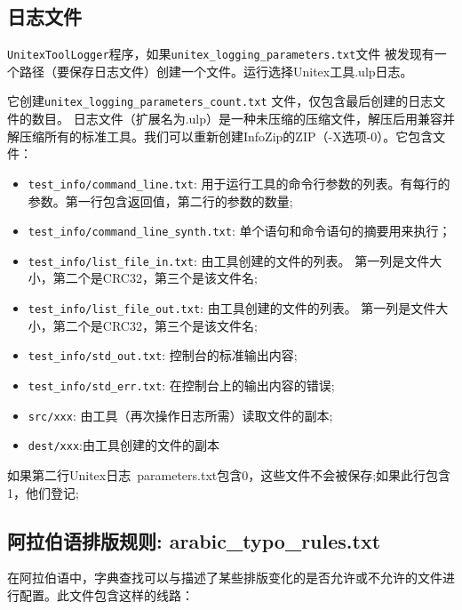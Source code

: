 \subsection{日志文件}
 \label{section-log-file}
\verb+UnitexToolLogger+程序，如果\verb+unitex_logging_parameters.txt+文件 被发现有一个路径（要保存日志文件）创建一个文件。运行选择Unitex工具.ulp日志。

\bigskip
它创建\verb+unitex_logging_parameters_count.txt+ 文件，仅包含最后创建的日志文件的数目。
日志文件（扩展名为.ulp）是一种未压缩的压缩文件，解压后用兼容并解压缩所有的标准工具。我们可以重新创建InfoZip的ZIP（-X选项-0）。它包含文件：


\begin{itemize}
\item \verb+test_info/command_line.txt+:
用于运行工具的命令行参数的列表。有每行的参数。第一行包含返回值，第二行的参数的数量;

  \item \verb+test_info/command_line_synth.txt+:
单个语句和命令语句的摘要用来执行；


\item \verb+test_info/list_file_in.txt+: 
由工具创建的文件的列表。
第一列是文件大小，第二个是CRC32，第三个是该文件名;

\item \verb+test_info/list_file_out.txt+: 
由工具创建的文件的列表。
第一列是文件大小，第二个是CRC32，第三个是该文件名;

  \item \verb+test_info/std_out.txt+: 控制台的标准输出内容;

  \item \verb+test_info/std_err.txt+: 在控制台上的输出内容的错误;

  \item \verb+src/xxx+: 
  由工具（再次操作日志所需）读取文件的副本;

  \item \verb+dest/xxx+:由工具创建的文件的副本
\end{itemize}
如果第二行Unitex日志\
parameters.txt包含0，这些文件不会被保存;如果此行包含1，他们登记;

\subsection{阿拉伯语排版规则: arabic\_typo\_rules.txt}
\label{subsection-arabic-typo-rules}
在阿拉伯语中，字典查找可以与描述了某些排版变化的是否允许或不允许的文件进行配置。此文件包含这样的线路：

